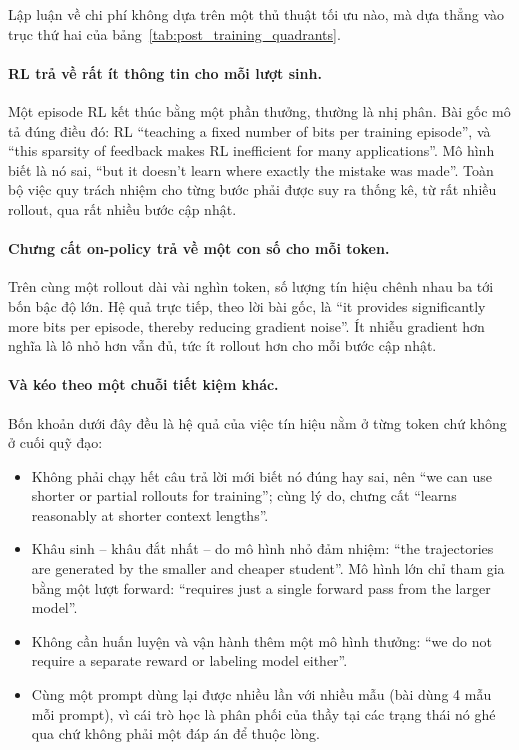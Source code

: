 Lập luận về chi phí không dựa trên một thủ thuật tối ưu nào, mà dựa thẳng vào trục thứ hai của bảng~\ref{tab:post_training_quadrants}.

\paragraph{RL trả về rất ít thông tin cho mỗi lượt sinh.} Một episode RL kết thúc bằng một phần thưởng, thường là nhị phân. Bài gốc mô tả đúng điều đó: RL ``teaching a fixed number of bits per training episode'', và ``this sparsity of feedback makes RL inefficient for many applications''. Mô hình biết là nó sai, ``but it doesn't learn where exactly the mistake was made''. Toàn bộ việc quy trách nhiệm cho từng bước phải được suy ra thống kê, từ rất nhiều rollout, qua rất nhiều bước cập nhật.

\paragraph{Chưng cất on-policy trả về một con số cho mỗi token.} Trên cùng một rollout dài vài nghìn token, số lượng tín hiệu chênh nhau ba tới bốn bậc độ lớn. Hệ quả trực tiếp, theo lời bài gốc, là ``it provides significantly more bits per episode, thereby reducing gradient noise''. Ít nhiễu gradient hơn nghĩa là lô nhỏ hơn vẫn đủ, tức ít rollout hơn cho mỗi bước cập nhật.

\paragraph{Và kéo theo một chuỗi tiết kiệm khác.} Bốn khoản dưới đây đều là hệ quả của việc tín hiệu nằm ở từng token chứ không ở cuối quỹ đạo:
\begin{itemize}
	\item Không phải chạy hết câu trả lời mới biết nó đúng hay sai, nên ``we can use shorter or partial rollouts for training''; cùng lý do, chưng cất ``learns reasonably at shorter context lengths''.
	\item Khâu sinh -- khâu đắt nhất -- do mô hình nhỏ đảm nhiệm: ``the trajectories are generated by the smaller and cheaper student''. Mô hình lớn chỉ tham gia bằng một lượt forward: ``requires just a single forward pass from the larger model''.
	\item Không cần huấn luyện và vận hành thêm một mô hình thưởng: ``we do not require a separate reward or labeling model either''.
	\item Cùng một prompt dùng lại được nhiều lần với nhiều mẫu (bài dùng 4 mẫu mỗi prompt), vì cái trò học là phân phối của thầy tại các trạng thái nó ghé qua chứ không phải một đáp án để thuộc lòng.
\end{itemize}

